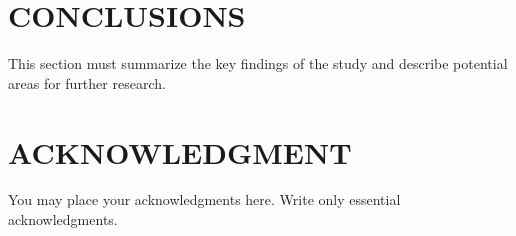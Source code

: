 \documentclass[10pt,letterpaper,twocolumn]{article}
\begin{document}
\section{CONCLUSIONS}
This section must summarize the key findings of the study and describe potential areas for further research.









\section*{ACKNOWLEDGMENT}
You may place your acknowledgments here. Write only essential acknowledgments.\\
\blindtext \blindtext \blindtext \blindtext \blindtext \blindtext \blindtext \blindtext 



\printbibliography[title={REFERENCES}]

\end{document}
